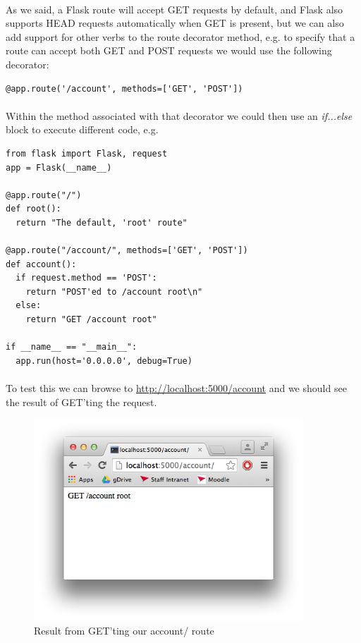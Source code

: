 \documentclass[12pt, a4paper, twoside]{book}
\begin{document}
\paragraph{} As we said, a Flask route will accept GET requests by default, and Flask also supports HEAD requests automatically when GET is present, but we can also add support for other verbs to the route decorator method, e.g. to specify that a route can accept both GET and POST requests we would use the following decorator:

\begin{lstlisting}
@app.route('/account', methods=['GET', 'POST'])
\end{lstlisting}

\paragraph{} Within the method associated with that decorator we could then use an \emph{if...else} block to execute different code, e.g. 

\begin{lstlisting}
from flask import Flask, request
app = Flask(__name__)

@app.route("/")
def root():
  return "The default, 'root' route"

@app.route("/account/", methods=['GET', 'POST'])
def account():
  if request.method == 'POST':
    return "POST'ed to /account root\n"
  else:
    return "GET /account root"

if __name__ == "__main__":
  app.run(host='0.0.0.0', debug=True)
\end{lstlisting}


\paragraph{} To test this we can browse to \url{http://localhost:5000/account} and we should see the result of GET'ting the request.

\begin{figure}[H]
\centering
\includegraphics[width=0.9\textwidth]{images/flask-simple-posting.png}
\caption{Result from GET'ting our account/ route}
\label{fig:flask-simple-posting}
\end{figure}
\end{document}

